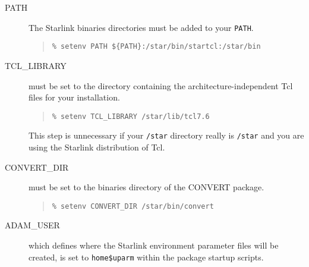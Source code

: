 \documentclass[twoside,11pt]{article}
\begin{document}
\begin{description}
\item[PATH] The Starlink binaries directories must be added to your
\texttt{PATH}.
\begin{quote} \begin{verbatim}
% setenv PATH ${PATH}:/star/bin/startcl:/star/bin
\end{verbatim} \end{quote}

\item[TCL\_LIBRARY] must be set to the directory containing the
architecture-independent Tcl files for your installation.
\begin{quote} \begin{verbatim}
% setenv TCL_LIBRARY /star/lib/tcl7.6
\end{verbatim} \end{quote}
This step is unnecessary if your \texttt{/star} directory really is
\texttt{/star}
and you are using the Starlink distribution of Tcl.

\item[CONVERT\_DIR] must be set to the binaries directory of
the CONVERT package.
\begin{quote} \begin{verbatim}
% setenv CONVERT_DIR /star/bin/convert
\end{verbatim} \end{quote}

\item[ADAM\_USER] which defines where the Starlink environment
parameter files will be created, is set to \texttt{home\$uparm} within the
package startup scripts.

\end{description}
\end{document}
